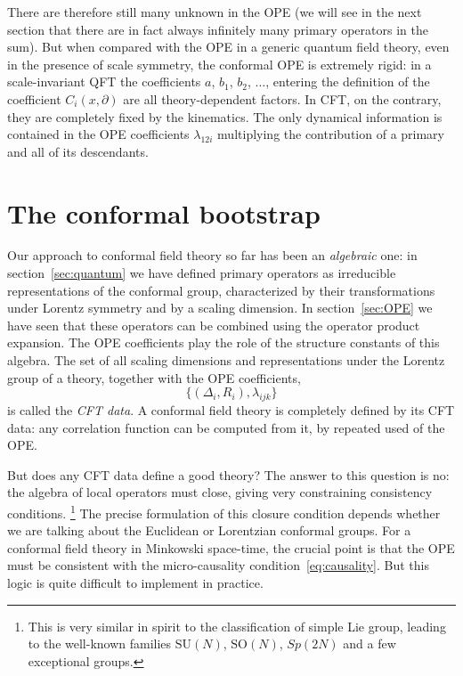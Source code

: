 \documentclass[a4paper,12pt]{article}
\numberwithin{equation}{section}
\begin{document}
There are therefore still many unknown in the OPE (we will see in the next section that there are in fact always infinitely many primary operators in the sum). But when compared with the OPE in a generic quantum field theory, even in the presence of scale symmetry, the conformal OPE is extremely rigid: in a scale-invariant QFT the coefficients $a$, $b_1$, $b_2$, $\ldots$, entering the definition of the coefficient $C_i(x, \partial)$ are all theory-dependent factors. In CFT, on the contrary, they are completely fixed by the kinematics. The only dynamical information is contained in the OPE coefficients $\lambda_{12i}$ multiplying the contribution of a primary and all of its descendants.



\section{The conformal bootstrap}
\label{sec:bootstrap}

Our approach to conformal field theory so far has been an \emph{algebraic} one:
in section~\ref{sec:quantum} we have defined primary operators as irreducible representations of the conformal group, characterized by their transformations under Lorentz symmetry and by a scaling dimension.
In section~\ref{sec:OPE} we have seen that these operators can be combined using the operator product expansion. The OPE coefficients play the role of the structure constants of this algebra.
The set of all scaling dimensions and representations under the Lorentz group of a theory, together with the OPE coefficients,
\begin{equation}
	\big\{ (\Delta_i, R_i), \lambda_{ijk} \big\}
	\label{eq:CFTdata}
\end{equation}
is called the \emph{CFT data}. A conformal field theory is completely defined by its CFT data: any correlation function can be computed from it, by repeated used of the OPE.

But does any CFT data define a good theory?
The answer to this question is no: the algebra of local operators must close, giving very constraining consistency conditions.%
%
\footnote{This is very similar in spirit to the classification of simple Lie group, leading to the well-known families $\text{SU}(N)$, $\text{SO}(N)$, $Sp(2N)$ and a few exceptional groups.}
%
The precise formulation of this closure condition depends whether we are talking about the Euclidean or Lorentzian conformal groups.
For a conformal field theory in Minkowski space-time, the crucial point is that the OPE must be consistent with the micro-causality condition~\eqref{eq:causality}. 
But this logic is quite difficult to implement in practice.
\end{document}
